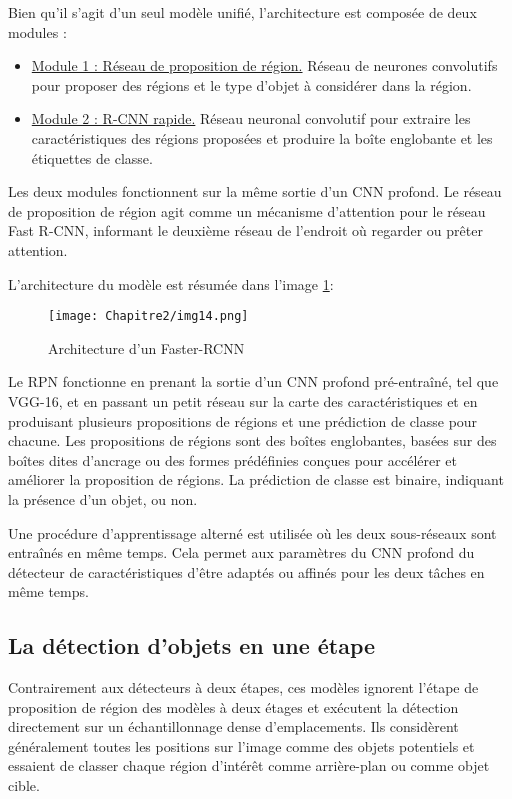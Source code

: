 \begin{enumerate}
Bien qu'il s'agit d'un seul modèle unifié, l'architecture est composée de deux modules :
\begin{itemize}
\item \underline{Module 1 : Réseau de proposition de région.}  Réseau de neurones convolutifs pour proposer des régions et le type d'objet à considérer dans la région.
\item \underline{Module 2 : R-CNN rapide.} Réseau neuronal convolutif pour extraire les caractéristiques des régions proposées et produire la boîte englobante et les étiquettes de classe.
\end{itemize}

Les deux modules fonctionnent sur la même sortie d'un CNN profond. Le réseau de proposition de région agit comme un mécanisme d'attention pour le réseau Fast R-CNN, informant le deuxième réseau de l'endroit où regarder ou prêter attention.

L'architecture du modèle est résumée dans l'image \ref{img14}:

\begin{figure}[H]
          \centering
          \texttt{[image: Chapitre2/img14.png]}
          \caption{Architecture d'un Faster-RCNN}
          \label{img14}
          \end{figure}
          
Le RPN fonctionne en prenant la sortie d'un CNN profond pré-entraîné, tel que VGG-16, et en passant un petit réseau sur la carte des caractéristiques et en produisant plusieurs propositions de régions et une prédiction de classe pour chacune. Les propositions de régions sont des boîtes englobantes, basées sur des boîtes dites d'ancrage ou des formes prédéfinies conçues pour accélérer et améliorer la proposition de régions. La prédiction de classe est binaire, indiquant la présence d'un objet, ou non.

Une procédure d'apprentissage alterné est utilisée où les deux sous-réseaux sont entraînés en même temps. Cela permet aux paramètres du CNN profond du détecteur de caractéristiques d'être adaptés ou affinés pour les deux tâches en même temps.
 \end{enumerate} 


    
     
\subsection{La détection d'objets en une étape}
Contrairement aux détecteurs à deux étapes, ces modèles ignorent l'étape de proposition de région des modèles à deux étages et exécutent la détection directement sur un échantillonnage dense d'emplacements. Ils considèrent généralement toutes les positions sur l'image comme des objets potentiels et essaient de classer chaque région d'intérêt comme arrière-plan ou comme objet cible.

